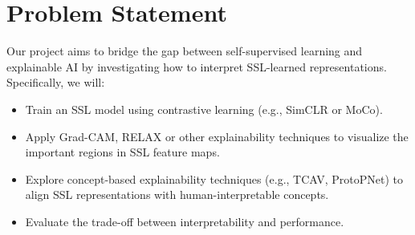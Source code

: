 \section{Problem Statement}
\label{sec:problem_statement}

Our project aims to bridge the gap between self-supervised learning and explainable AI by investigating how to interpret SSL-learned representations. Specifically, we will:
\begin{itemize}
    \item Train an SSL model using contrastive learning (e.g., SimCLR\cite{chen2020simple} or MoCo\cite{he2020momentum}).
    \item Apply Grad-CAM\cite{selvaraju2017grad}, RELAX\cite{wickstrom2023relax} or other explainability techniques to visualize the important regions in SSL feature maps.
    \item Explore concept-based explainability techniques (e.g., TCAV, ProtoPNet) to align SSL representations with human-interpretable concepts.
    \item Evaluate the trade-off between interpretability and performance.
\end{itemize}
